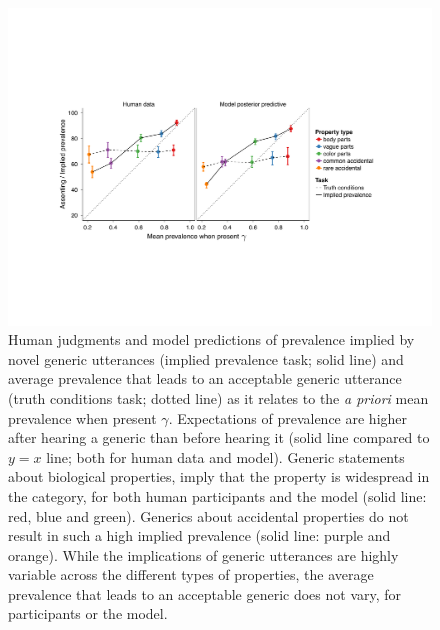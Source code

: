 \documentclass[12pt,letterpaper]{article}
\newcommand{\ndg}[1]{\textcolor{Green}{[ndg: #1]}}
\begin{document}
\begin{figure}
\centering
    \includegraphics[width=\columnwidth]{asym-lines-data-model-2phi-2so-50kx3.pdf}
    \caption{Human judgments and model predictions of prevalence implied by novel generic utterances (implied prevalence task; solid line) and average prevalence that leads to an acceptable generic utterance (truth conditions task; dotted line) as it relates to the \emph{a priori} mean prevalence when present $\gamma$.
    Expectations of prevalence are higher after hearing a generic than before hearing it (solid line compared to $y=x$ line; both for human data and model).
    Generic statements about biological properties, imply that the property is widespread in the category, for both human participants and the model (solid line: red, blue and green). 
    Generics about accidental properties do not result in such a high implied prevalence (solid line: purple and orange).  
	While the implications of generic utterances are highly variable across the different types of properties, the average prevalence that leads to an acceptable generic does not vary, for participants or the model.
}
  \label{fig:exp2b}
\end{figure}
\end{document}
